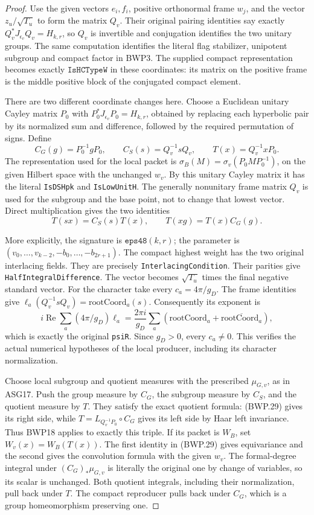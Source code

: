 \begin{proof}
Use the given vectors \(e_i,f_i\), positive orthonormal frame
\(w_j\), and the vector \(z_u/\sqrt{T_u}\) to form the
matrix \(Q_v\).  Their original pairing identities say exactly
\(Q_v^*J_{\epsilon_v}Q_v=H_{k,r}\), so \(Q_v\) is
invertible and conjugation identifies the two unitary groups.
The same computation identifies the literal flag stabilizer,
unipotent subgroup and compact factor in BWP3.  The supplied compact
representation becomes exactly \(\texttt{IsHCTypeW}\) in these
coordinates: its matrix on the positive frame is the middle positive
block of the conjugated compact element.

There are two different coordinate changes here.  Choose a
Euclidean unitary Cayley matrix \(P_0\) with
\(P_0^*J_{\epsilon_v}P_0=H_{k,r}\), obtained by replacing each
hyperbolic pair by its normalized sum and difference, followed by
the required permutation of signs.  Define
\[
 C_G(g)=P_0^{-1}gP_0,\qquad C_S(s)=Q_v^{-1}sQ_v,
 \qquad T(x)=Q_v^{-1}xP_0.
 \tag{BWP.28}
\]
The representation used for the local packet is
\(\sigma_B(M)=\sigma_v(P_0MP_0^{-1})\), on the given Hilbert
space with the unchanged \(w_v\).  By this unitary Cayley matrix
it has the literal \texttt{IsDSHpk} and \texttt{IsLowUnitH}.
The generally nonunitary frame matrix \(Q_v\) is used for the
subgroup and the base point, not to change that lowest vector.
Direct multiplication gives the two identities
\[
 T(sx)=C_S(s)T(x),\qquad T(xg)=T(x)C_G(g).
 \tag{BWP.29}
\]

More explicitly, the signature is \(\texttt{eps48}(k,r)\);
the parameter is \((v_0,\ldots,v_{k-2},-b_0,\ldots,-b_{2r+1})\).
The compact highest weight has the two original interlacing fields.
They are precisely \texttt{InterlacingCondition}.  Their parities
give \texttt{HalfIntegralDifference}.  The vector becomes
\(\sqrt{T_u}\) times the final negative standard vector.
For the character take every \(c_a=4\pi/g_D\).
The frame identities give
\(\ell_a(Q_v^{-1}sQ_v)=\mathrm{rootCoord}_a(s)\).
Consequently its exponent is
\[
 i\operatorname{Re}\sum_a(4\pi/g_D)\ell_a
 =\frac{2\pi i}{g_D}\sum_a
       (\mathrm{rootCoord}_a+\overline{\mathrm{rootCoord}_a}),
\]
which is exactly the original \texttt{psiR}.  Since \(g_D>0\),
every \(c_a\ne0\).  This verifies the actual numerical hypotheses
of the local producer, including its character normalization.

Choose local subgroup and quotient measures with the prescribed
\(\mu_{G,v}\), as in ASG17.  Push the group measure by \(C_G\),
the subgroup measure by \(C_S\), and the quotient measure by \(T\).
They satisfy the exact quotient formula: (BWP.29) gives its right
side, while \(T=L_{Q_v^{-1}P_0}\circ C_G\) gives its left side
by Haar left invariance.  Thus BWP18 applies to exactly this triple.
If its packet is \(W_B\), set \(W_v(x)=W_B(T(x))\).
The first identity in (BWP.29) gives equivariance and the second gives
the convolution formula with the given \(w_v\).  The formal-degree
integral under \((C_G)_*\mu_{G,v}\) is literally the original
one by change of variables, so its scalar is unchanged.
Both quotient integrals, including their normalization, pull back
under \(T\).  The compact reproducer pulls back under \(C_G\),
which is a group homeomorphism preserving one.


\end{proof}
